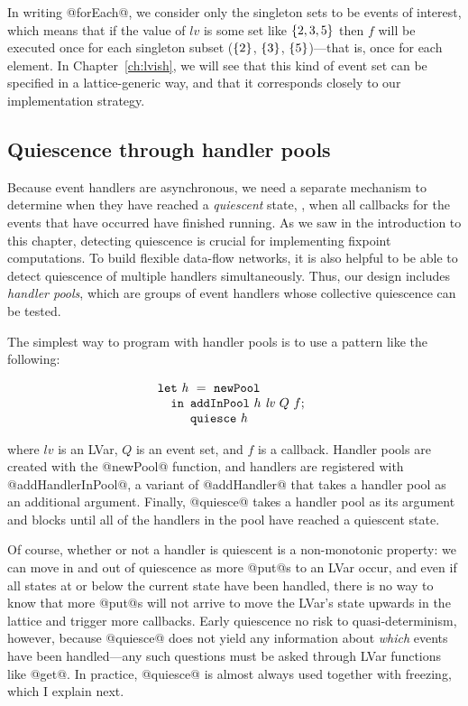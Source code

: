 In writing @forEach@, we consider only the singleton sets to be events
of interest, which means that if the value of $\mathit{lv}$ is some
set like $\left\{2, 3, 5\right\}$ then $f$ will be executed once for each
singleton subset ($\left\{2\right\}$, $\left\{3\right\}$, $\left\{5\right\}$)---that is,
once for each element.  In Chapter~\ref{ch:lvish}, we will see that
this kind of event set can be specified in a lattice-generic way, and
that it corresponds closely to our implementation strategy.

\subsection{Quiescence through handler pools}\label{subsection:quasi-quiescence}

Because event handlers are asynchronous, we need a separate mechanism
to determine when they have reached a \emph{quiescent} state, \ie,
when all callbacks for the events that have occurred have finished
running.  As we saw in the introduction to this chapter, detecting
quiescence is crucial for implementing fixpoint computations.  To
build flexible data-flow networks, it is also helpful to be able to
detect quiescence of multiple handlers simultaneously.  Thus, our
design includes \emph{handler pools}, which are groups of event
handlers whose collective quiescence can be tested.

The simplest way to program with handler pools is to use a pattern
like the following:

\singlespacing
\[
\begin{array}[t]{l}
\termfont{let}~\mathit{h}~=~\NEWPOOL \\
\letspace \termfont{in}
  \begin{array}[t]{l}
    \ADDHANDLERINPOOL~h~\mathit{lv}~Q~f; \\
    \QUIESCE~h
  \end{array}
\end{array}
\]
\doublespacing

where $\mathit{lv}$ is an LVar, $Q$ is an event set, and $f$ is a
callback.  Handler pools are created with the @newPool@ function, and
handlers are registered with @addHandlerInPool@, a variant of
@addHandler@ that takes a handler pool as an additional argument.
Finally, @quiesce@ takes a handler pool as its argument and blocks
until all of the handlers in the pool have reached a quiescent state.

Of course, whether or not a handler is quiescent is a non-monotonic
property: we can move in and out of quiescence as more @put@s to an
LVar occur, and even if all states at or below the current state have
been handled, there is no way to know that more @put@s will not arrive
to move the LVar's state upwards in the lattice and trigger more
callbacks.  Early quiescence no risk to quasi-determinism, however,
because @quiesce@ does not yield any information about \emph{which}
events have been handled---any such questions must be asked through
LVar functions like @get@.  In practice, @quiesce@ is almost always
used together with freezing, which I explain next.

